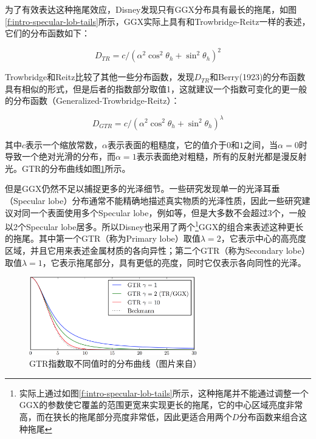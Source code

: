 为了有效表达这种拖尾效应，Disney发现只有GGX分布\cite{a:Microfacetmodelsforrefractionthroughroughsurfaces}具有最长的拖尾，如图\ref{f:intro-specular-lob-tails}所示，GGX实际上具有和Trowbridge-Reitz\cite{a:Averageirregularityrepresentationofaroughrayreflection}一样的表述，它们的分布函数如下：

\begin{equation}
	D_{TR}=c/(\alpha^2 \cos^2\theta_h +\sin^2\theta_h)^2
\end{equation}

\noindent Trowbridge和Reitz比较了其他一些分布函数，发现$D_{TR}$和Berry(1923)的分布函数具有相似的形式，但是后者的指数部分取值1，这就建议一个指数可变化的更一般的分布函数（Generalized-Trowbridge-Reitz）：

\begin{equation}
	D_{GTR}=c/(\alpha^2 \cos^2\theta_h +\sin^2\theta_h)^\lambda
\end{equation}

\noindent 其中$c$表示一个缩放常数，$\alpha$表示表面的粗糙度，它的值介于$0$和$1$之间，当$\alpha=0$时导致一个绝对光滑的分布，而$\alpha=1$表示表面绝对粗糙，所有的反射光都是漫反射光。GTR的分布曲线如图\ref{f:intro-gtr}所示。

但是GGX仍然不足以捕捉更多的光泽细节。一些研究发现单一的光泽耳垂（Specular lobe）分布通常不能精确地描述真实物质的光泽性质，因此一些研究建议对同一个表面使用多个Specular lobe，例如\cite{a:GlobalOptimizationforEstimatingaMultiple-LobeAnalyticalBRDF}等，但是大多数不会超过3个，一般以2个Specular lobe居多。所以Disney也采用了两个\footnote{实际上通过如图\ref{f:intro-specular-lob-tails}所示，这种拖尾并不能通过调整一个GGX的参数使它覆盖的范围更宽来实现更长的拖尾，它的中心区域亮度非常高，而在狭长的拖尾部分亮度非常低，因此更适合用两个$D$分布函数来组合这种拖尾}GGX的组合来表述这种更长的拖尾。其中第一个GTR（称为Primary lobe）取值$\lambda=2$，它表示中心的高亮度区域，并且它用来表述金属材质的各向异性；第二个GTR（称为Secondary lobe）取值$\lambda=1$，它表示拖尾部分，具有更低的亮度，同时它仅表示各向同性的光泽。

\begin{figure}
	\sidecaption
	\includegraphics[width=0.65\textwidth]{figures/intro/gtr}
	\caption{GTR指数取不同值时的分布曲线（图片来自\cite{a:PhysicallyBasedShadingatDisney}）}
	\label{f:intro-gtr}
\end{figure}


